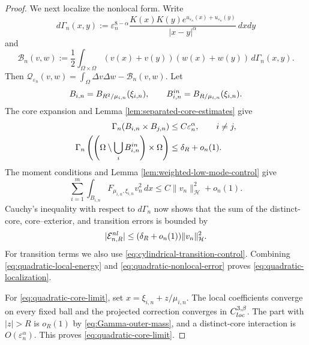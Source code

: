 \documentclass[10pt,a4paper]{amsart}
\begin{document}
\begin{proof}
We next localize the nonlocal form. Write
\[
d\Gamma_n(x,y)
:=\varepsilon_n^{8-\alpha}
\frac{K(x)K(y)e^{u_{\varepsilon_n}(x)+u_{\varepsilon_n}(y)}}
{|x-y|^\alpha}\,dxdy
\]
and
\[
\mathcal B_n(v,w)
:=\frac12\int_{\Omega\times\Omega}
(v(x)+v(y))(w(x)+w(y))\,d\Gamma_n(x,y).
\]
Then
$\mathcal Q_{\varepsilon_n}(v,w)
=\int_\Omega\Delta v\Delta w-\mathcal B_n(v,w)$. Let
\[
B_{i,n}=B_{R^2/\mu_{i,n}}(\xi_{i,n}),
\qquad
B_{i,n}^{\rm in}=B_{R/\mu_{i,n}}(\xi_{i,n}).
\]
The core expansion and Lemma
\ref{lem:separated-core-estimates} give
\begin{align}
\Gamma_n(B_{i,n}\times B_{j,n})
&\leq C\varepsilon_n^\alpha,
\qquad i\ne j,
\notag\\
\Gamma_n\left(
\left(\Omega\setminus\bigcup_iB_{i,n}^{\rm in}\right)
\times\Omega\right)
&\leq\delta_R+o_n(1).
\label{eq:Gamma-outer-mass}
\end{align}
The moment conditions and Lemma
\ref{lem:weighted-low-mode-control} give
\begin{equation*}
\sum_{i=1}^m
\int_{B_{i,n}}F_{\mu_{i,n},\xi_{i,n}}v_n^2\,dx
\leq C\|v_n\|_{\mathcal H}^2+o_n(1).
\end{equation*}
Cauchy's inequality with respect to $d\Gamma_n$ now shows that the
sum of the distinct-core, core--exterior, and transition errors is
bounded by
\begin{equation}\label{eq:quadratic-nonlocal-error}
|\mathcal E_{n,R}^{\rm nl}|
\leq(\delta_R+o_n(1))\|v_n\|_{\mathcal H}^2.
\end{equation}
For transition terms we also use
\eqref{eq:cylindrical-transition-control}. Combining
\eqref{eq:quadratic-local-energy} and
\eqref{eq:quadratic-nonlocal-error} proves
\eqref{eq:quadratic-localization}.

For \eqref{eq:quadratic-core-limit}, set
$x=\xi_{i,n}+z/\mu_{i,n}$. The local coefficients converge on every
fixed ball and the projected correction converges in
$C^{3,\beta}_{\rm loc}$. The part with $|z|>R$ is $o_R(1)$ by
\eqref{eq:Gamma-outer-mass}, and a distinct-core interaction is
$O(\varepsilon_n^\alpha)$. This proves
\eqref{eq:quadratic-core-limit}.
\end{proof}
\end{document}

